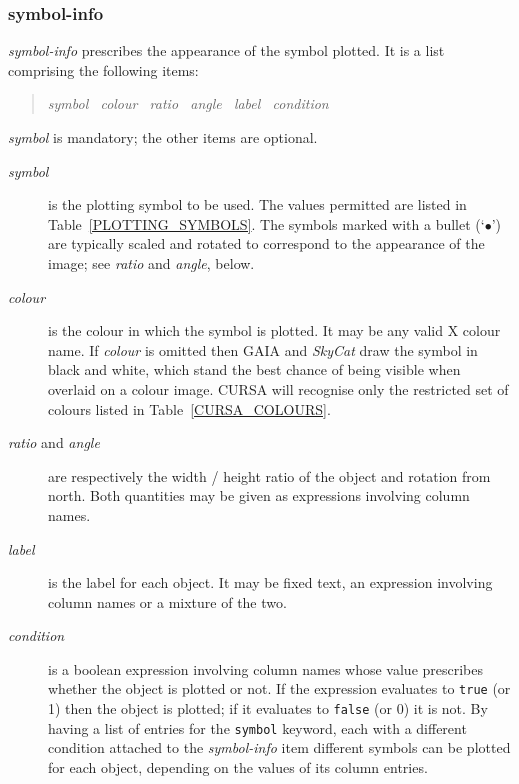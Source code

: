 \documentclass[twoside,11pt]{article}
\renewcommand{\_}{\texttt{\symbol{95}}}
\begin{document}
\subsubsection{symbol-info \label{SYMBOLINFO_R}}

{\it symbol-info}\/ prescribes the appearance of the symbol plotted.
It is a list comprising the following items:

\begin{quote}
{\it symbol ~colour ~ratio ~angle ~label ~condition}
\end{quote}

{\it symbol}\/ is mandatory; the other items are optional.

\begin{description}

  \item[{\it symbol}] is the plotting symbol to be used.  The values
   permitted are listed in Table~\ref{PLOTTING_SYMBOLS}.  The symbols
   marked with a bullet (`$\bullet$') are typically scaled and rotated
   to correspond to the appearance of the image; see {\it ratio}\/ and
   {\it angle}, below.

  \item[{\it colour}] is the colour in which the symbol is plotted.  It may
   be any valid X colour name.  If {\it colour}\/ is omitted then GAIA
   and {\it SkyCat}\/ draw the symbol in black and white, which stand the
   best chance of being visible when overlaid on a colour image.  CURSA
   will recognise only the restricted set of colours listed in
   Table~\ref{CURSA_COLOURS}.

  \item[{\it ratio}\/ and {\it angle}] are respectively the width / height
   ratio of the object and rotation from north.
   Both quantities may be given as expressions involving column names.

  \item[{\it label}] is the label for each object.  It may be fixed text,
   an expression involving column names or a mixture of the two.

  \item[{\it condition}] is a boolean expression involving column names
   whose value prescribes whether the object is plotted or not.  If the
   expression evaluates to {\tt true} (or 1) then the object is plotted;
   if it evaluates to {\tt false} (or 0) it is not.  By having a list of
   entries for the {\tt symbol} keyword, each with a different condition
   attached to the {\it symbol-info}\/ item different symbols can be
   plotted for each object, depending on the values of its column entries.

\end{description}
\end{document}
